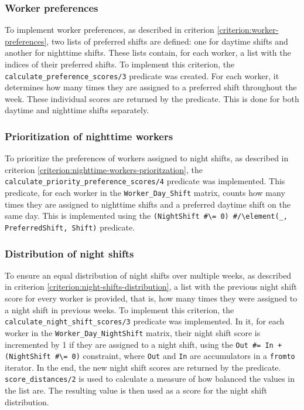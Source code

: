 \documentclass[conference]{IEEEtran}
\def\constraint#1{\vspace{4pt} {#1}}
\begin{document}
\constraint {
    \subsubsection*{Worker preferences}
    To implement worker preferences, as described in criterion \ref{criterion:worker-preferences}, two lists of preferred shifts are defined: one for daytime shifts and another for nighttime shifts. These lists contain, for each worker, a list with the indices of their preferred shifts.
    To implement this criterion, the \texttt{calculate\_preference\_scores/3} predicate was created. For each worker, it determines how many times they are assigned to a preferred shift throughout the week. These individual scores are returned by the predicate. This is done for both daytime and nighttime shifts separately.
}

\constraint {
    \subsubsection*{Prioritization of nighttime workers}
    To prioritize the preferences of workers assigned to night shifts, as described in criterion \ref{criterion:nighttime-workers-prioritzation}, the \texttt{calculate\_priority\_preference\_scores/4} predicate was implemented. This predicate, for each worker in the \texttt{Worker\_Day\_Shift} matrix, counts how many times they are assigned to nighttime shifts and a preferred daytime shift on the same day. This is implemented using the \texttt{(NightShift \#\textbackslash= 0) \#/\textbackslash element(\_, PreferredShift, Shift)} predicate.
}

\constraint {
    \subsubsection*{Distribution of night shifts}
    To ensure an equal distribution of night shifts over multiple weeks, as described in criterion \ref{criterion:night-shifts-distribution}, a list with the previous night shift score for every worker is provided, that is, how many times they were assigned to a night shift in previous weeks.
    To implement this criterion, the \texttt{calculate\_night\_shift\_scores/3} predicate was implemented. In it, for each worker in the \texttt{Worker\_Day\_NightShift} matrix, their night shift score is incremented by 1 if they are assigned to a night shift, using the \texttt{Out \#= In + (NightShift \#\textbackslash= 0)} constraint, where \texttt{Out} and \texttt{In} are accumulators in a \texttt{fromto} iterator. In the end, the new night shift scores are returned by the predicate. \texttt{score\_distances/2} is used to calculate a measure of how balanced the values in the list are. The resulting value is then used as a score for the night shift distribution.
}
\end{document}
